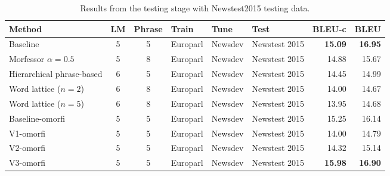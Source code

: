 \begin{table*}[!h]
    {\small
    \begin{center}
        \begin{tabular}{lcclllrr}
            \hline
            \textbf{Method} & \textbf{LM} & \textbf{Phrase} & \textbf{Train} & \textbf{Tune} &
            \textbf{Test} & \textbf{BLEU-c} & \textbf{BLEU} \\
            \hline
            Baseline & 5 & 5 & Europarl & Newsdev & Newstest 2015 &
            \textbf{15.09} & \textbf{16.95} \\
            Morfessor $\alpha=0.5$ & 5 & 8 & Europarl & Newsdev & Newstest 2015
            & 14.88 & 15.67 \\
            Hierarchical phrase-based & 6 & 5 & Europarl & Newsdev &
            Newstest 2015 & 14.45 & 14.99 \\
            Word lattice ($n=2$) & 6 & 8 & Europarl & Newsdev & Newstest 2015
            & 14.00 & 14.67 \\
            Word lattice ($n=5$) & 6 & 8 & Europarl & Newsdev & Newstest 2015
            & 13.95 & 14.68 \\
            \hline
            Baseline-omorfi & 5 & 5 & Europarl & Newsdev & Newstest 2015 & 15.25 & 16.14 \\
            V1-omorfi & 5 & 5 & Europarl & Newsdev & Newstest 2015 & 14.00 & 14.79 \\
            V2-omorfi & 5 & 5 & Europarl & Newsdev & Newstest 2015 & 14.32 & 15.14 \\
            V3-omorfi & 5 & 5 & Europarl & Newsdev & Newstest 2015 & \textbf{15.98} & \textbf{16.90} \\
            \hline
        \end{tabular}
    \caption{Results from the testing stage with Newstest2015 testing data.}
    \label{table:test}
    \end{center}
    }
\end{table*}
